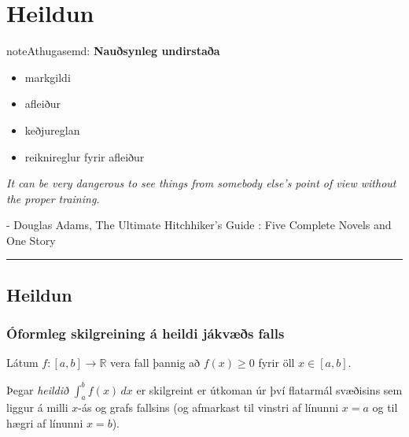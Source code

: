 \documentclass[b5paper,11pt,icelandic]{sphinxmanual}
\begin{document}


\chapter{Heildun}
\label{kafli06:heildun}\label{kafli06::doc}
\begin{notice}{note}{Athugasemd:}
\textbf{Nauðsynleg undirstaða}
\begin{itemize}
\item {} 
markgildi

\item {} 
afleiður

\item {} 
keðjureglan

\item {} 
reiknireglur fyrir afleiður

\end{itemize}
\end{notice}

\emph{It can be very dangerous to see things from somebody else's point of view without the proper training.}

- Douglas Adams, The Ultimate Hitchhiker's Guide : Five Complete Novels and One Story


\bigskip\hrule{}\bigskip



\section{Heildun}
\label{kafli06:id1}

\subsection{Óformleg skilgreining á heildi jákvæðs falls}
\label{kafli06:oformleg-skilgreining-a-heildi-jakvaes-falls}
Látum \(f:[a,b]\rightarrow {{\mathbb  R}}\) vera fall þannig að
\(f(x)\geq 0\) fyrir öll \(x\in[a,b]\).

Þegar \textit{heildið} \(\int_a^b f(x)\,dx\) er skilgreint er útkoman úr því
flatarmál svæðisins sem liggur á milli \(x\)-ás og grafs fallsins
(og afmarkast til vinstri af línunni \(x=a\) og til hægri af línunni
\(x=b\)).
\end{document}
